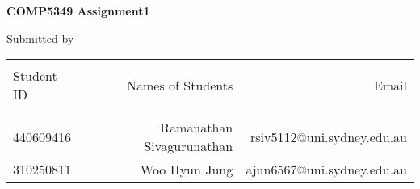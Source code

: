 \begin{titlepage}

\begin{center}

\Large \textbf {COMP5349 Assignment1}\\[0.5in]
      
        \vspace{.2in}

\normalsize Submitted by \\
\begin{table}[h]
\centering
\begin{tabular}{lrr}\hline \\
Student ID & Names of Students & Email\\ \\ \hline
\\
440609416 & Ramanathan Sivagurunathan & rsiv5112@uni.sydney.edu.au\\
310250811 & Woo Hyun Jung & ajun6567@uni.sydney.edu.au \\
\end{tabular}
\end{table}
\vfill

\end{center}

\end{titlepage}
